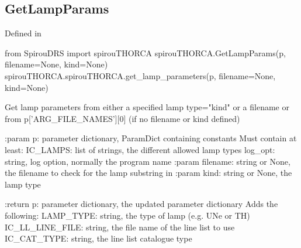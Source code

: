 \noindent\begin{minipage}{\textwidth}
\subsection{GetLampParams}

Defined in \spirouTHORCA{}

\begin{pythonbox}
from SpirouDRS import spirouTHORCA
spirouTHORCA.GetLampParams(p, filename=None, kind=None)
spirouTHORCA.spirouTHORCA.get_lamp_parameters(p, filename=None, kind=None)
\end{pythonbox}

\begin{pythondocstring}
Get lamp parameters from either a specified lamp type="kind" or a filename
or from p['ARG_FILE_NAMES'][0] (if no filename or kind defined)

:param p: parameter dictionary, ParamDict containing constants
    Must contain at least:
        IC_LAMPS: list of strings, the different allowed lamp types
        log_opt: string, log option, normally the program name
:param filename: string or None, the filename to check for the lamp
                 substring in
:param kind: string or None, the lamp type

:return p: parameter dictionary, the updated parameter dictionary
        Adds the following:
            LAMP_TYPE: string, the type of lamp (e.g. UNe or TH)
            IC_LL_LINE_FILE: string, the file name of the line list to use
            IC_CAT_TYPE: string, the line list catalogue type
\end{pythondocstring}
\end{minipage}

